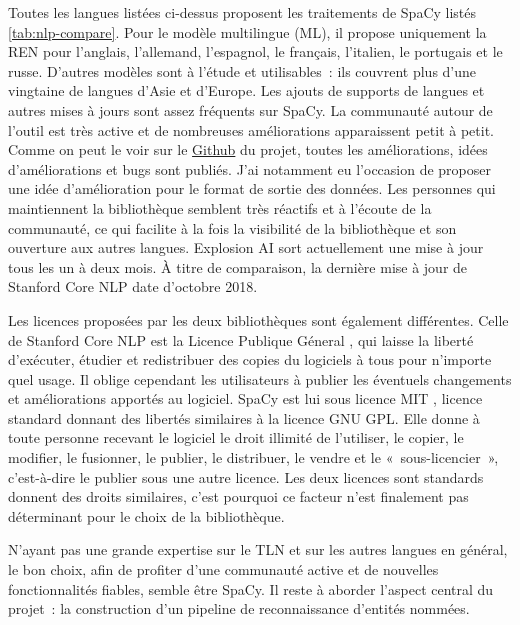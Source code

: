 Toutes les langues listées ci-dessus proposent les traitements de SpaCy listés \autoref{tab:nlp-compare}. Pour le modèle multilingue (ML), il propose uniquement la REN pour l'anglais, l'allemand, l'espagnol, le français, l'italien, le portugais et le russe. D'autres modèles sont à l'étude et utilisables~: ils couvrent plus d'une vingtaine de langues d'Asie et d'Europe. Les ajouts de supports de langues et autres mises à jours sont assez fréquents sur SpaCy. La communauté autour de l'outil est très active et de nombreuses améliorations apparaissent petit à petit. Comme on peut le voir sur le \href{https://github.com/explosion/spaCy}{Github} \cite{spacy-repo} du projet, toutes les améliorations, idées d'améliorations et bugs sont publiés. J'ai notamment eu l'occasion de proposer une idée d'amélioration pour le format de sortie des données. Les personnes qui maintiennent la bibliothèque semblent très réactifs et à l'écoute de la communauté, ce qui facilite à la fois la visibilité de la bibliothèque et son ouverture aux autres langues. Explosion AI sort actuellement une mise à jour tous les un à deux mois. À titre de comparaison, la dernière mise à jour de Stanford Core NLP date d'octobre 2018.
\newline

Les licences proposées par les deux bibliothèques sont également différentes. Celle de Stanford Core NLP est la Licence Publique Géneral \cite{gnu}, qui laisse la liberté d'exécuter, étudier et redistribuer des copies du logiciels à tous pour n'importe quel usage. Il oblige cependant les utilisateurs à publier les éventuels changements et améliorations apportés au logiciel. SpaCy est lui sous licence MIT \cite{mit}, licence standard donnant des libertés similaires à la licence GNU GPL. Elle donne à toute personne recevant le logiciel le droit illimité de l'utiliser, le copier, le modifier, le fusionner, le publier, le distribuer, le vendre et le «~sous-licencier~», c'est-à-dire le publier sous une autre licence. Les deux licences sont standards donnent des droits similaires, c'est pourquoi ce facteur n'est finalement pas déterminant pour le choix de la bibliothèque.
\newline

N'ayant pas une grande expertise sur le TLN et sur les autres langues en général, le bon choix, afin de profiter d'une communauté active et de nouvelles fonctionnalités fiables, semble être SpaCy. Il reste  à aborder l'aspect central du projet~: la construction d'un pipeline de reconnaissance d'entités nommées.
\label{section 3.1.3}

